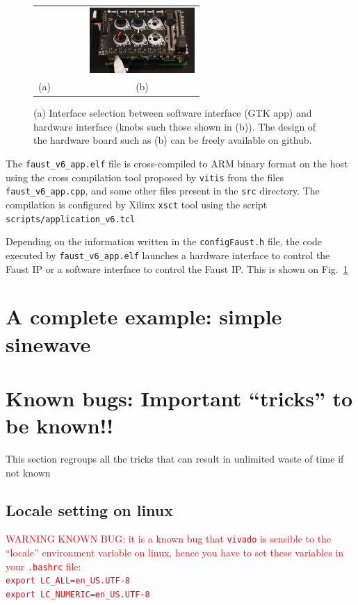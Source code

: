 \documentclass[11pt]{article}
\numberwithin{equation}{section}
\numberwithin{figure}{section}
\newcommand{\red}{\textcolor{red}}
\newcommand{\knownbug}[1]{\red{WARNING KNOWN BUG: #1}}
\begin{document}
\begin{figure}[ht]
\centering
  \begin{tabular}{ccc}
    &~~~~ &
    \includegraphics[width=4cm]{fig/popophone.jpg}\\
    (a) & &(b)
    \end{tabular}
\caption{(a) Interface selection between software interface (GTK app) and hardware interface (knobs such those shown in (b)). The design of the hardware board such as (b) can be freely available on github.}
\label{fig:interfaceOverview}
\end{figure}
  The {\tt faust\_v6\_app.elf} file is cross-compiled to ARM binary format on the host using the cross compilation tool proposed by {\tt vitis} from the files {\tt faust\_v6\_app.cpp}, and some other files present in the {\tt src} directory. The compilation is configured by Xilinx {\tt xsct} tool using the script {\tt scripts/application\_v6.tcl}

Depending on the information written in the {\tt configFaust.h} file, the code executed by {\tt faust\_v6\_app.elf} launches a hardware interface to control the Faust IP or a software interface to control the Faust IP. This is shown on Fig.~\ref{fig:interfaceOverview}


\section{A complete example: simple sinewave}






\newpage
\appendix
\label{Annex1}
      


\section{Known bugs: Important ``tricks'' to be known!!}
\label{bug}

This section regroups all the tricks that can result in unlimited waste of time if not known

\subsection{Locale setting on linux}
\label{localSetting}
\knownbug{it is a known bug that {\tt vivado} is sensible to the ``locale'' environment variable on linux, hence you have to set these variables in your {\tt .bashrc} file:\\
\tt export LC\_ALL=en\_US.UTF-8\\
export LC\_NUMERIC=en\_US.UTF-8
}
\end{document}
